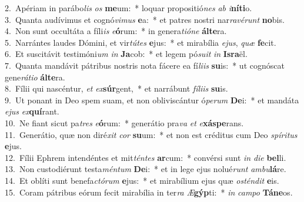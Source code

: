 {2.~}Apériam in parábo\textit{lis} \textit{os} \textbf{me}um:~* loquar propositió\textit{nes} \textit{ab} \textit{i}\textbf{ní}\textbf{ti}o.\\
{3.~}Quanta audívimus et cognó\textit{vi}\textit{mus} \textbf{e}a:~* et patres nostri nar\textit{ra}\textit{vé}\textit{runt} \textbf{no}bis.\\
{4.~}Non sunt occultáta a fíli\textit{is} \textit{e}\textbf{ó}rum:~* in genera\textit{ti}\textit{ó}\textit{ne} \textbf{ál}\textbf{te}ra.\\
{5.~}Narrántes laudes Dómini, et vir\textit{tú}\textit{tes} \textbf{e}jus:~* et mirabília \textit{e}\textit{jus}, \textit{quæ} \textbf{fe}cit.\\
{6.~}Et suscitávit testimóni\textit{um} \textit{in} \textbf{Ja}cob:~* et legem pó\textit{su}\textit{it} \textit{in} \textbf{Is}\textbf{ra}ël.\\
{7.~}Quanta mandávit pátribus nostris nota fácere ea fí\textit{li}\textit{is} \textbf{su}is:~* ut cognóscat gene\textit{rá}\textit{ti}\textit{o} \textbf{ál}\textbf{te}ra.\\
{8.~}Fílii qui nascéntur, \textit{et} \textit{ex}\textbf{súr}gent,~* et narrábunt \textit{fí}\textit{li}\textit{is} \textbf{su}is.\\
{9.~}Ut ponant in Deo spem suam, et non obliviscántur ó\textit{pe}\textit{rum} \textbf{De}i:~* et mandáta \textit{e}\textit{jus} \textit{ex}\textbf{quí}rant.\\
{10.~}Ne fiant sicut pa\textit{tres} \textit{e}\textbf{ó}rum:~* generátio pra\textit{va} \textit{et} \textit{e}\textbf{xá}\textbf{spe}rans.\\
{11.~}Generátio, quæ non diré\textit{xit} \textit{cor} \textbf{su}um:~* et non est créditus cum Deo \textit{spí}\textit{ri}\textit{tus} \textbf{e}jus.\\
{12.~}Fílii Ephrem intendéntes et mit\textit{tén}\textit{tes} \textbf{ar}cum:~* convérsi sunt \textit{in} \textit{di}\textit{e} \textbf{bel}li.\\
{13.~}Non custodiérunt testa\textit{mén}\textit{tum} \textbf{De}i:~* et in lege ejus nolué\textit{runt} \textit{am}\textit{bu}\textbf{lá}re.\\
{14.~}Et oblíti sunt benefa\textit{ctó}\textit{rum} \textbf{e}jus:~* et mirabílium ejus quæ \textit{o}\textit{stén}\textit{dit} \textbf{e}is.\\
{15.~}Coram pátribus eórum fecit mirabília in ter\textit{ra} \textit{Æ}\textbf{gýp}ti:~* \textit{in} \textit{cam}\textit{po} \textbf{Tá}\textbf{ne}os.\\
